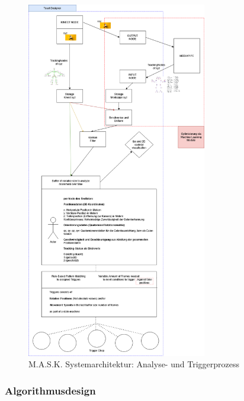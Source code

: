 \begin{figure}[H]
    \centering
    \includegraphics[width=0.7\textwidth]{images/MASK.png}
    \caption{M.A.S.K. Systemarchitektur: Analyse- und Triggerprozess}
    \label{fig:mask_architecture}
\end{figure}

\subsubsection{Algorithmusdesign}

